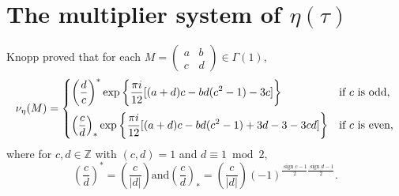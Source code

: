 \documentclass[12pt]{article}
\theoremstyle{definition}
\numberwithin{equation}{section}
\numberwithin{theorem}{section}
\newcommand{\sign}{\operatorname{sign}}
\begin{document}
\section{The multiplier system of $\eta(\tau)$}
\label{sec:eta}

Knopp \cite[pp.51]{Knopp} proved that for each 
$
M
=
\begin{pmatrix}
a & b \\
c & d
\end{pmatrix}
\in
\Gamma(1),
$
\begin{equation}
\label{eqn-eta-multiplier}
\nu_{\eta}(M)=
\begin{cases}
\displaystyle
\left(
\frac{d}{c}
\right)^{*}   
\exp
\left\{
\frac{\pi i}{12}
[
(a+d)c-bd(c^2-1)-3c
]
\right\} 
&
\text{if $c$ is odd,}
\vspace{2mm}  \\
\displaystyle
\left(
\frac{c}{d}
\right)_{*}
\exp
\left\{
\frac{\pi i}{12}
[
(a+d)c-bd(c^2-1)+3d-3-3cd
]
\right\} 
&
\text{if $c$ is even,}
\end{cases}
\end{equation}
where for $c,d\in \mathbb{Z}$ with $(c,d)=1$ and $d\equiv 1 \bmod{2},$ 
\begin{equation*}
\left(
\frac{c}{d}
\right)^{*}=
\left(
\frac{c}{ |d|}
\right)
\mathrm{and} 
\left(
\frac{c}{d}
\right)_{*}
=
\left(
\frac{c}{ |d|}
\right)
(-1)^{
\frac{\sign c-1}{2}
\frac{\sign d-1}{2}
}. 
\end{equation*}
\end{document}
